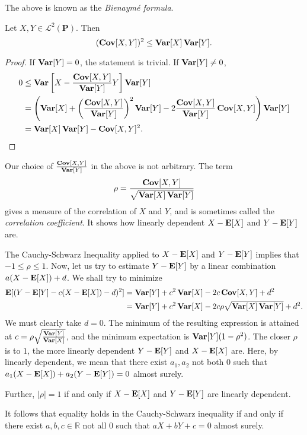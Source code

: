 The above is known as the \textit{Bienaym\'{e} formula}.

\begin{theorem}
    Let $X,Y\in\mathcal{L}^2(\textbf{P})$. Then
    $$(\operatorname{\textbf{Cov}}[X,Y])^2\leq \operatorname{\textbf{Var}}[X]\operatorname{\textbf{Var}}[Y].$$
\end{theorem}
\begin{proof}
    If $\operatorname{\textbf{Var}}[Y]=0$, the statement is trivial. If $\operatorname{\textbf{Var}}[Y]\neq 0$,
    \begin{align*}
        0 &\leq \operatorname{\textbf{Var}}\left[X - \frac{\operatorname{\textbf{Cov}}[X,Y]}{\operatorname{\textbf{Var}}[Y]}Y\right]\operatorname{\textbf{Var}}[Y] \\
        &= \left(\operatorname{\textbf{Var}}[X] + \left(\frac{\operatorname{\textbf{Cov}}[X,Y]}{\operatorname{\textbf{Var}}[Y]}\right)^2\operatorname{\textbf{Var}}[Y] - 2\frac{\operatorname{\textbf{Cov}}[X,Y]}{\operatorname{\textbf{Var}}[Y]}\operatorname{\textbf{Cov}}[X,Y]\right)\operatorname{\textbf{Var}}[Y] \\
        &= \operatorname{\textbf{Var}}[X]\operatorname{\textbf{Var}}[Y] - \operatorname{\textbf{Cov}}[X,Y]^2.
    \end{align*}
\end{proof}

Our choice of $\frac{\operatorname{\textbf{Cov}}[X,Y]}{\operatorname{\textbf{Var}}[Y]}$ in the above is not arbitrary. The term
$$\rho=\frac{\operatorname{\textbf{Cov}}[X,Y]}{\sqrt{\operatorname{\textbf{Var}}[X]\operatorname{\textbf{Var}}[Y]}}$$
gives a measure of the correlation of $X$ and $Y$, and is sometimes called the \textit{correlation coefficient}. It shows how linearly dependent $X-\textbf{E}[X]$ and $Y-\textbf{E}[Y]$ are.

The Cauchy-Schwarz Inequality applied to $X-\textbf{E}[X]$ and $Y-\textbf{E}[Y]$ implies that $-1\leq\rho\leq 1$. Now, let us try to estimate $Y-\textbf{E}[Y]$ by a linear combination $a(X-\textbf{E}[X])+d$. We shall try to minimize
\begin{align*}
    \textbf{E}[(Y-\textbf{E}[Y]-c(X-\textbf{E}[X])-d)^2] &= \operatorname{\textbf{Var}}[Y] + c^2\operatorname{\textbf{Var}}[X]-2c\operatorname{\textbf{Cov}}[X,Y]+d^2 \\
    &= \operatorname{\textbf{Var}}[Y] + c^2\operatorname{\textbf{Var}}[X]-2c\rho\sqrt{\operatorname{\textbf{Var}}[X]\operatorname{\textbf{Var}}[Y]}+d^2.
\end{align*}
We must clearly take $d=0$. The minimum of the resulting expression is attained at $c=\rho\sqrt{\frac{\operatorname{\textbf{Var}}[Y]}{\operatorname{\textbf{Var}}[X]}}$, and the minimum expectation is $\operatorname{\textbf{Var}}[Y](1-\rho^2)$. The closer $\rho$ is to $1$, the more linearly dependent $Y-\textbf{E}[Y]$ and $X-\textbf{E}[X]$ are. Here, by linearly dependent, we mean that there exist $a_1,a_2$ not both $0$ such that $a_1(X-\textbf{E}[X])+a_2(Y-\textbf{E}[Y])=0$ almost surely.

Further, $|\rho|=1$ if and only if $X-\textbf{E}[X]$ and $Y-\textbf{E}[Y]$ are linearly dependent.

\vspace{1mm}
It follows that equality holds in the Cauchy-Schwarz inequality if and only if there exist $a,b,c\in\mathbb{R}$ not all $0$ such that $aX+bY+c=0$ almost surely.

